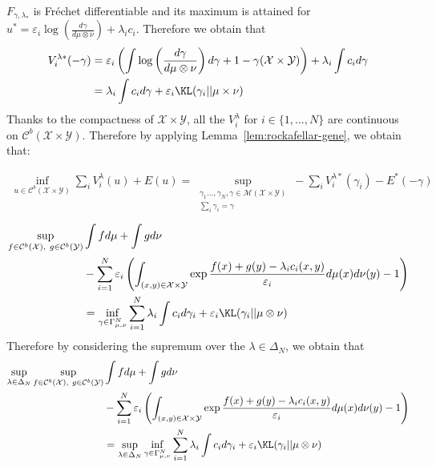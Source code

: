 \begin{prv*}
$F_{\gamma,\lambda_*}$ is Fréchet differentiable and its maximum is attained for 
$u^*=\varepsilon_i \log\left(\frac{d\gamma}{d\mu\otimes\nu}\right)+\lambda_i c_i$. Therefore we obtain that
\begin{align*}
 V^{\lambda*}_i(-\gamma)&=\varepsilon_i\left(\int \log\left(\frac{d\gamma}{d\mu\otimes\nu}\right)d\gamma +1- \gamma(\mathcal{X}\times\mathcal{Y})\right)+\lambda_i\int c_i d\gamma\\
 &=\lambda_i\int c_id\gamma+\varepsilon_i\KL(\gamma_i||\mu\times\nu)
\end{align*}   
Thanks to the compactness of $\mathcal{X}\times\mathcal{Y}$, all the $V_i^{\lambda}$ for $i\in\{1,...,N\}$ are continuous on $\mathcal{C}^b(\mathcal{X}\times\mathcal{Y})$. Therefore by applying Lemma~\ref{lem:rockafellar-gene}, we obtain that:

\begin{align*}
\inf_{u\in \mathcal{C}^b(\mathcal{X}\times\mathcal{Y})} \sum_i V_i^{\lambda}(u) + E(u) = \sup\limits_{\substack{\gamma_1...,\gamma_N,\gamma\in \mathcal{M}(\mathcal{X}\times\mathcal{Y})\\\sum_i \gamma_i = \gamma}}-\sum_i V_i^{\lambda*}(\gamma_i)-E^*(-\gamma)
\end{align*}
\begin{align*}
\sup\limits_{f\in \mathcal{C}^b(\mathcal{X}),~g\in\mathcal{C}^b(\mathcal{Y})}&\int fd\mu+\int gd\nu \\
& - \sum_{i=1}^N \varepsilon_i\left(\int_{(x,y)\in\mathcal{X}\times\mathcal{Y}} \exp{\frac{f(x)+g(y)-\lambda_ic_i(x,y)}{\varepsilon_i}}d\mu(x)d\nu(y)-1\right)\\
&= \inf_{\gamma\in\Gamma^N_{\mu,\nu}} \sum_{i=1}^N \lambda_i\int c_i d\gamma_i + \varepsilon_i\KL(\gamma_i||\mu\otimes\nu)
\end{align*}
Therefore by considering the supremum over the $\lambda\in\Delta_N$, we obtain that
\begin{align*}
 \sup_{\lambda\in\Delta_N}  \sup\limits_{f\in \mathcal{C}^b(\mathcal{X}),~g\in\mathcal{C}^b(\mathcal{Y})}&\int fd\mu+\int gd\nu \\
& - \sum_{i=1}^N \varepsilon_i\left(\int_{(x,y)\in\mathcal{X}\times\mathcal{Y}} \exp{\frac{f(x)+g(y)-\lambda_ic_i(x,y)}{\varepsilon_i}}d\mu(x)d\nu(y)-1\right)\\
   &=\sup_{\lambda\in\Delta_N}\inf_{\gamma\in\Gamma^N_{\mu,\nu}} \sum_{i=1}^N \lambda_i\int c_i d\gamma_i + \varepsilon_i \KL(\gamma_i||\mu\otimes\nu)
\end{align*}



\end{prv*}
